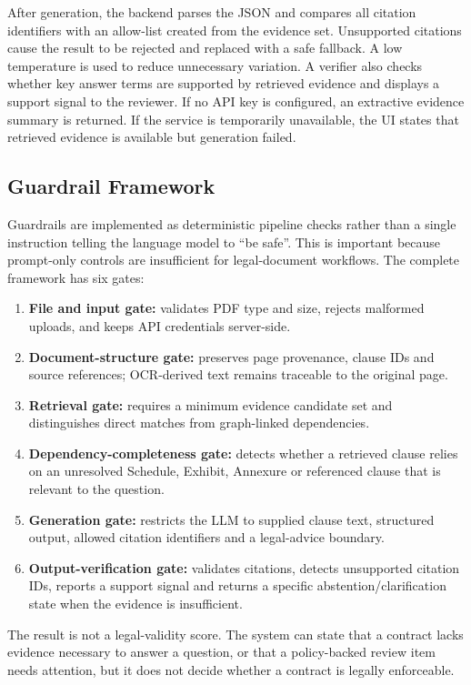 \documentclass[12pt,a4paper,oneside]{report}
\begin{document}
After generation, the backend parses the JSON and compares all citation identifiers with an allow-list created from the evidence set. Unsupported citations cause the result to be rejected and replaced with a safe fallback. A low temperature is used to reduce unnecessary variation. A verifier also checks whether key answer terms are supported by retrieved evidence and displays a support signal to the reviewer. If no API key is configured, an extractive evidence summary is returned. If the service is temporarily unavailable, the UI states that retrieved evidence is available but generation failed.

\subsection{Guardrail Framework}
Guardrails are implemented as deterministic pipeline checks rather than a single instruction telling the language model to ``be safe''. This is important because prompt-only controls are insufficient for legal-document workflows. The complete framework has six gates:
\begin{enumerate}
  \item \textbf{File and input gate:} validates PDF type and size, rejects malformed uploads, and keeps API credentials server-side.
  \item \textbf{Document-structure gate:} preserves page provenance, clause IDs and source references; OCR-derived text remains traceable to the original page.
  \item \textbf{Retrieval gate:} requires a minimum evidence candidate set and distinguishes direct matches from graph-linked dependencies.
  \item \textbf{Dependency-completeness gate:} detects whether a retrieved clause relies on an unresolved Schedule, Exhibit, Annexure or referenced clause that is relevant to the question.
  \item \textbf{Generation gate:} restricts the LLM to supplied clause text, structured output, allowed citation identifiers and a legal-advice boundary.
  \item \textbf{Output-verification gate:} validates citations, detects unsupported citation IDs, reports a support signal and returns a specific abstention/clarification state when the evidence is insufficient.
\end{enumerate}

The result is not a legal-validity score. The system can state that a contract lacks evidence necessary to answer a question, or that a policy-backed review item needs attention, but it does not decide whether a contract is legally enforceable.
\end{document}
